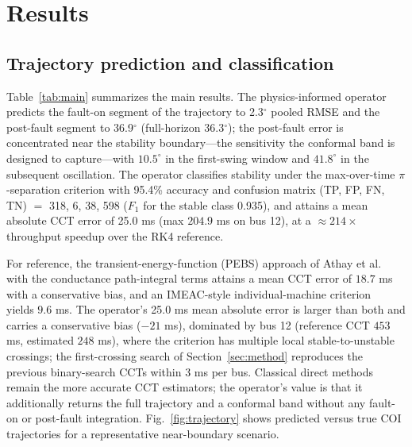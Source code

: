 \documentclass[5p,times]{elsarticle}
\newcommand{\rmseFault}{2.3}          %
\newcommand{\rmsePost}{36.9}          %
\newcommand{\rmseAll}{36.3}           %
\newcommand{\pctACC}{95.4\%}          %
\newcommand{\ccterr}{25.0}            %
\newcommand{\confmat}{318, 6, 38, 598} %
\newcommand{\fone}{0.935}             %
\newcommand{\timSU}{214}              %
\begin{document}
\section{Results}
\label{sec:results}

\subsection{Trajectory prediction and classification}
Table~\ref{tab:main} summarizes the main results. The physics-informed operator predicts the
fault-on segment of the trajectory to \rmseFault{}$^\circ$ pooled RMSE and the post-fault segment
to \rmsePost{}$^\circ$ (full-horizon \rmseAll{}$^\circ$); the post-fault error is concentrated
near the stability boundary---the sensitivity the conformal band is designed to capture---with
$10.5^\circ$ in the first-swing window and $41.8^\circ$ in the subsequent oscillation. The
operator classifies stability under the max-over-time $\pi$-separation criterion with \pctACC{}
accuracy and confusion matrix (TP, FP, FN, TN) $=$ \confmat{} ($F_1$ for the stable class
\fone{}), and attains a mean absolute CCT error of \ccterr{} ms (max $204.9$ ms on bus 12), at
a $\approx\timSU{}\times$ throughput speedup over the RK4 reference.

For reference, the transient-energy-function (PEBS) approach of Athay et
al.~\cite{athay1979transient} with the conductance path-integral terms attains a mean CCT error
of $18.7$ ms with a conservative bias, and an IMEAC-style individual-machine
criterion~\cite{wang2018individual} yields $9.6$ ms. The operator's \ccterr{} ms mean absolute
error is larger than both and carries a conservative bias
($-21$ ms), dominated by bus 12 (reference CCT $453$ ms, estimated $248$ ms), where the criterion
has multiple local stable-to-unstable crossings; the first-crossing search of
Section~\ref{sec:method} reproduces the previous binary-search CCTs within $3$ ms per bus.
Classical direct methods remain the more accurate CCT estimators; the operator's value is that it
additionally returns the full trajectory and a conformal band without any fault-on or post-fault
integration. Fig.~\ref{fig:trajectory} shows predicted versus true COI trajectories for a
representative near-boundary scenario.
\end{document}
